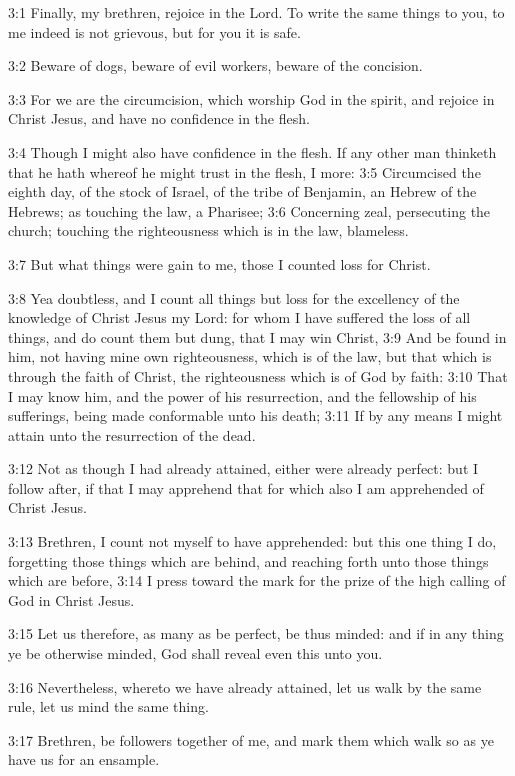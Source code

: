 3:1 Finally, my brethren, rejoice in the Lord. To write the same
things to you, to me indeed is not grievous, but for you it is safe.

3:2 Beware of dogs, beware of evil workers, beware of the concision.

3:3 For we are the circumcision, which worship God in the spirit, and
rejoice in Christ Jesus, and have no confidence in the flesh.

3:4 Though I might also have confidence in the flesh. If any other man
thinketh that he hath whereof he might trust in the flesh, I more: 3:5
Circumcised the eighth day, of the stock of Israel, of the tribe of
Benjamin, an Hebrew of the Hebrews; as touching the law, a Pharisee;
3:6 Concerning zeal, persecuting the church; touching the
righteousness which is in the law, blameless.

3:7 But what things were gain to me, those I counted loss for Christ.

3:8 Yea doubtless, and I count all things but loss for the excellency
of the knowledge of Christ Jesus my Lord: for whom I have suffered the
loss of all things, and do count them but dung, that I may win Christ,
3:9 And be found in him, not having mine own righteousness, which is
of the law, but that which is through the faith of Christ, the
righteousness which is of God by faith: 3:10 That I may know him, and
the power of his resurrection, and the fellowship of his sufferings,
being made conformable unto his death; 3:11 If by any means I might
attain unto the resurrection of the dead.

3:12 Not as though I had already attained, either were already
perfect: but I follow after, if that I may apprehend that for which
also I am apprehended of Christ Jesus.

3:13 Brethren, I count not myself to have apprehended: but this one
thing I do, forgetting those things which are behind, and reaching
forth unto those things which are before, 3:14 I press toward the mark
for the prize of the high calling of God in Christ Jesus.

3:15 Let us therefore, as many as be perfect, be thus minded: and if
in any thing ye be otherwise minded, God shall reveal even this unto
you.

3:16 Nevertheless, whereto we have already attained, let us walk by
the same rule, let us mind the same thing.

3:17 Brethren, be followers together of me, and mark them which walk
so as ye have us for an ensample.

